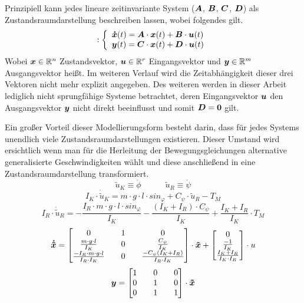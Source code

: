 Prinzipiell kann jedes lineare zeitinvariante System %
($\boldsymbol{A}$, $\boldsymbol{B}$, $\boldsymbol{C}$, $\boldsymbol{D}$) als Zustandsraumdarstellung beschreiben lassen, wobei folgendes gilt.
\begin{equation}
: \left\{ \begin{array}{ll}
\boldsymbol{\dot{x}}(t) = \boldsymbol{A}\cdot \boldsymbol{x}(t) + \boldsymbol{B}\cdot \boldsymbol{u}(t) \\
\boldsymbol{y}(t) = \boldsymbol{C}\cdot \boldsymbol{x}(t) + \boldsymbol{D}\cdot \boldsymbol{u}(t)
\end{array}
\right.
\end{equation}
Wobei $\boldsymbol{x} \in \mathbb{R}^n$ Zustandsvektor, $\boldsymbol{u} \in \mathbb{R}^r$ Eingangsvektor und $\boldsymbol{y} \in \mathbb{R}^m$ Ausgangsvektor heißt. Im weiteren Verlauf wird die Zeitabhängigkeit dieser drei Vektoren nicht mehr explizit angegeben. Des weiteren werden in dieser Arbeit lediglich nicht sprungfähige Systeme  betrachtet, deren Eingangsvektor $\boldsymbol{u}$  den Ausgangsvektor $\boldsymbol{y}$ nicht direkt beeinflusst und somit $\boldsymbol{D} = \boldsymbol{0}$ gilt.

Ein großer Vorteil dieser Modellierungsform besteht darin, dass für jedes Systems unendlich viele Zustandsraumdarstellungen existieren. Dieser Umstand wird ersichtlich wenn man für die Herleitung der Bewegungsgleichungen alternative generalisierte Geschwindigkeiten wählt und diese anschließend in eine Zustandsraumdarstellung transformiert.
\begin{equation}
\tilde{u}_K \equiv \dot{\phi} \hspace{35pt} \tilde{u}_R \equiv \dot{\psi}
\end{equation}
\begin{equation}
I_K\cdot \dot{\tilde{u}}_K = m\cdot g \cdot l \cdot sin_{\varphi} + C_{\psi}\cdot \tilde{u}_R - T_M
\end{equation}
\begin{equation}
I_R\cdot \dot{\tilde{u}}_R = -\frac{I_R\cdot m\cdot g\cdot l\cdot sin_{\varphi}}{I_K} - \frac{(I_K + I_R)\cdot C_{\psi}}{I_K} + \frac{I_K + I_R}{I_K}\cdot T_M
\end{equation}
\begin{equation}
\boldsymbol{\dot{\tilde{x}}} = \begin{bmatrix}
0 && 1 && 0 
\\
\frac{m\cdot g\cdot l}{I_K} && 0 && \frac{C_{\psi}}{I_K}
\\
\frac{-I_R\cdot m\cdot g\cdot l}{I_R\cdot I_K} && 0 && \frac{-C_{\psi}(I_K+I_R)}{I_R\cdot I_K} 
\end{bmatrix}\cdot \boldsymbol{\tilde{x}}
+
\begin{bmatrix}
0 \\ \frac{-1}{I_K} \\ \frac{I_K+I_R}{I_K\cdot I_R}
\end{bmatrix} \cdot u
\end{equation}
\begin{equation}
\boldsymbol{y} = \begin{bmatrix}
1 && 0 && 0 \\
0 && 1 && 0 \\
0 && 1 && 1 \\
\end{bmatrix} \cdot \boldsymbol{\tilde{x}}
\end{equation}

